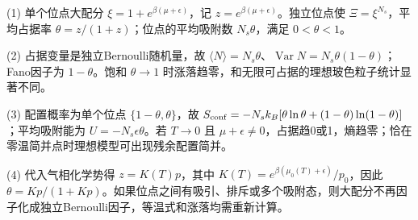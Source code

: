 (1) 单个位点大配分 \(\xi=1+e^{\beta(\mu+\epsilon)}\)，记 \(z=e^{\beta(\mu+\epsilon)}\)。独立位点使 \(\Xi=\xi^{N_s}\)，平均占据率 \(\boxed{\theta=z/(1+z)}\)；位点的平均吸附数 \(N_s\theta\)，满足 \(0<\theta<1\)。

(2) 占据变量是独立Bernoulli随机量，故 \(\langle N\rangle=N_s\theta\)、\(\operatorname{Var}N=N_s\theta(1-\theta)\)；Fano因子为 \(1-\theta\)。饱和 \(\theta\to1\) 时涨落趋零，和无限可占据的理想玻色粒子统计显著不同。

(3) 配置概率为单个位点 \(\{1-\theta,\theta\}\)，故 \(S_{\rm conf}=-N_sk_B[\theta\ln\theta+(1-\theta)\ln(1-\theta)]\)；平均吸附能为 \(U=-N_s\epsilon\theta\)。若 \(T\to0\) 且 \(\mu+\epsilon\ne0\)，占据趋0或1，熵趋零；恰在零温简并点时理想模型可出现残余配置简并。

(4) 代入气相化学势得 \(z=K(T)p\)，其中 \(K(T)=e^{\beta(\mu_0(T)+\epsilon)}/p_0\)，因此 \(\boxed{\theta=Kp/(1+Kp)}\)。如果位点之间有吸引、排斥或多个吸附态，则大配分不再因子化成独立Bernoulli因子，等温式和涨落均需重新计算。
